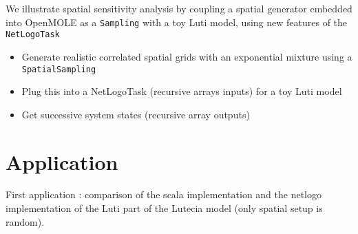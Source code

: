 We illustrate spatial sensitivity analysis by coupling a spatial generator embedded into OpenMOLE as a \texttt{Sampling} with a toy Luti model, using new features of the \texttt{NetLogoTask}

\begin{itemize}
	\item Generate realistic correlated spatial grids with an exponential mixture using a \texttt{SpatialSampling}
	\item Plug this into a NetLogoTask (recursive arrays inputs) for a toy Luti model
	\item Get successive system states (recursive array outputs)
\end{itemize}




\section{Application}

First application : comparison of the scala implementation and the netlogo implementation of the Luti part of the Lutecia model (only spatial setup is random).













